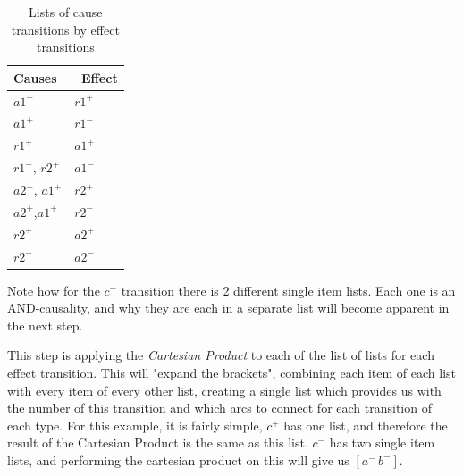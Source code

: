 \documentclass[british,conference,compsoc]{IEEEtran}
\begin{document}
\vspace{-1mm}

\begin{table}[h]
\caption{Lists of cause transitions by effect transitions
		\label{tab:list-of-concepts}}
  \centering
\begin{tabular}[htb]{| m{2.6cm} | m{2.0cm} |}
  \hline
Causes & \, Effect \\ \hline \hline
$a1^{-}$ & $r1^{+}$ \\ \hline
$a1^{+}$ & $r1^{-}$ \\ \hline
$r1^{+}$ & $a1^{+}$ \\ \hline
$r1^{-}$, $r2^{+}$ & $a1^{-}$ \\ \hline
$a2^{-}$, $a1^{+}$ & $r2^{+}$ \\ \hline
$a2^{+}$,$a1^{+}$ & $r2^{-}$ \\ \hline
$r2^{+}$ & $a2^{+}$ \\ \hline
$r2^{-}$ & $a2^{-}$ \\ \hline
  \end{tabular}
  \vspace{-1mm}
\end{table}

%

%
%

\noindent Note how for the $c^{-}$ transition there is 2 different single item 
lists. Each one is an AND-causality, and why they are each in a separate list
will become apparent in the next step. 

This step is applying the \emph{Cartesian Product} to each of the list of lists
for each effect transition. This will "expand the brackets", combining each
item of each list with every item of every other list, creating a single list 
which provides us with the number of this transition and which arcs to connect
for each transition of each type. For this example, it is fairly simple, $c^{+}$
has one list, and therefore the result of the Cartesian Product is the same as 
this list. $c^{-}$ has two single item lists, and performing the cartesian 
product on this will give us $[a^{-}\,b^{-}]$. 
\end{document}
